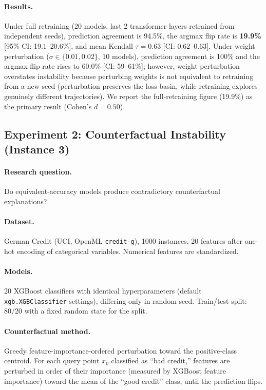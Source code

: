 \documentclass[11pt,a4paper]{article}
\begin{document}
\paragraph{Results.}
Under full retraining (20 models, last 2 transformer layers retrained from
independent seeds), prediction agreement is 94.5\%, the argmax flip rate is
\textbf{19.9\%} [95\% CI: 19.1--20.6\%], and mean Kendall $\tau = 0.63$
[CI: 0.62--0.63].  Under weight perturbation ($\sigma \in \{0.01, 0.02\}$,
10 models), prediction agreement is 100\% and the argmax flip rate rises to
60.0\% [CI: 59--61\%]; however, weight perturbation overstates instability
because perturbing weights is not equivalent to retraining from a new seed
(perturbation preserves the loss basin, while retraining explores genuinely
different trajectories).  We report the full-retraining figure (19.9\%) as
the primary result (Cohen's $d = 0.50$).

\subsection{Experiment 2: Counterfactual Instability (Instance 3)}
\label{app:exp-counterfactual}

\paragraph{Research question.}
Do equivalent-accuracy models produce contradictory counterfactual explanations?

\paragraph{Dataset.}
German Credit (UCI, OpenML \texttt{credit-g}), 1000 instances, 20 features
after one-hot encoding of categorical variables.  Numerical features are
standardized.

\paragraph{Models.}
20 XGBoost classifiers with identical hyperparameters (default \texttt{xgb.XGBClassifier}
settings), differing only in random seed.  Train/test split: 80/20 with a fixed
random state for the split.

\paragraph{Counterfactual method.}
Greedy feature-importance-ordered perturbation toward the positive-class centroid.
For each query point $x_0$ classified as ``bad credit,'' features are perturbed
in order of their importance (measured by XGBoost feature importance) toward the
mean of the ``good credit'' class, until the prediction flips.
\end{document}
